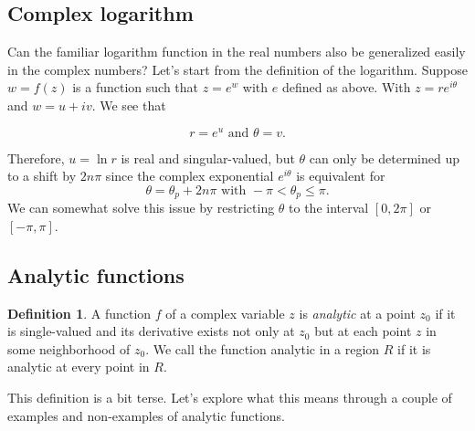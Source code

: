 \documentclass[12pt]{article}
\theoremstyle{definition}
\newtheorem{defn}[thm]{Definition}
\theoremstyle{remark}
\numberwithin{equation}{section}
\begin{document}

\subsection{Complex logarithm}%
\label{sub:the_logarithm}

Can the familiar logarithm function in the real numbers also be generalized easily in the complex numbers? Let's start from the definition of the logarithm. Suppose $w=f(z)$ is a function such that $z = e^w$ with $e$ defined as above. With $z = re^{i\theta}$ and $w = u + iv$. We see that 

\begin{equation*}
  r = e^u \text{ and } \theta = v.
\end{equation*}

Therefore, $u = \ln r$ is real and singular-valued, but $\theta$ can only be determined up to a shift by $2n\pi$ since the complex exponential $e^{i\theta}$ is equivalent for 
\begin{equation}
  \theta = \theta_p + 2n\pi \text{ with } -\pi < \theta_p \leq \pi.
\end{equation}
We can somewhat solve this issue by restricting $\theta$ to the interval $[0,2\pi]$ or $[-\pi, \pi]$. 

\subsection{Analytic functions}%
\label{sub:analytic_functions}


\begin{defn}
  A function $f$ of a complex variable $z$ is \emph{analytic} at a point $z_0$ if it is single-valued and its derivative exists not only at $z_0$ but at each point $z$ in some neighborhood of $z_0$. We call the function analytic in a region $R$ if it is analytic at every point in $R$.
\end{defn}
This definition is a bit terse. Let's explore what this means through a couple of examples and non-examples of analytic functions.

\end{document}
